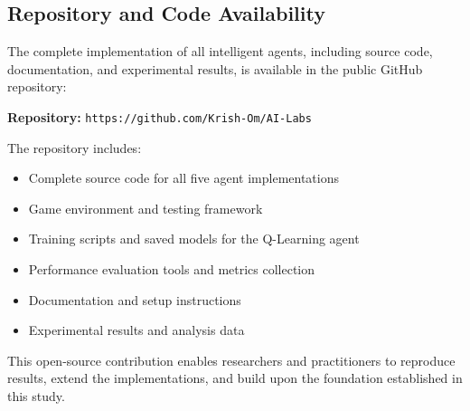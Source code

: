 \documentclass[11pt,a4paper]{article}
\begin{document}
\subsection{Repository and Code Availability}

The complete implementation of all intelligent agents, including source code, documentation, and experimental results, is available in the public GitHub repository:

\textbf{Repository:} \texttt{https://github.com/Krish-Om/AI-Labs}

The repository includes:
\begin{itemize}
\item Complete source code for all five agent implementations
\item Game environment and testing framework
\item Training scripts and saved models for the Q-Learning agent
\item Performance evaluation tools and metrics collection
\item Documentation and setup instructions
\item Experimental results and analysis data
\end{itemize}

This open-source contribution enables researchers and practitioners to reproduce results, extend the implementations, and build upon the foundation established in this study.
\end{document}
